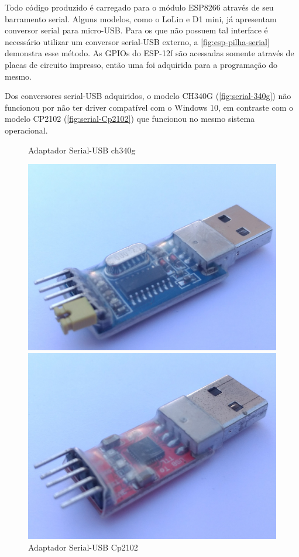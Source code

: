 Todo código produzido é carregado para o módulo ESP8266 através de seu
barramento serial. Alguns modelos, como o LoLin e D1 mini, já apresentam
conversor serial para micro-USB. Para os que não possuem tal interface é
necessário utilizar um conversor serial-USB externo, a
\autoref{fig:esp-pilha-serial} demonstra esse método. As GPIOs do ESP-12f são
acessadas somente através de placas de circuito impresso, então uma foi
adquirida para a programação do mesmo.

Dos conversores serial-USB adquiridos, o modelo CH340G
(\autoref{fig:serial-340g}) não funcionou por não ter driver compatível com o
Windows 10, em contraste com o modelo CP2102 (\autoref{fig:serial-Cp2102}) que
funcionou no mesmo sistema operacional.


\begin{figure}[htb]
	\centering
	\begin{minipage}{0.49\textwidth}
		\centering
		\caption{Adaptador Serial-USB ch340g \label{fig:serial-340g}}
		\includegraphics[width=1\textwidth]{041-esp8266/img/serial-ch340g.jpg}
	\end{minipage}
	\hfill
	\begin{minipage}{0.49\textwidth}
		\centering
		\caption{Adaptador Serial-USB Cp2102 \label{fig:serial-Cp2102}}
		\includegraphics[width=1\textwidth]{041-esp8266/img/serial-Cp2102.jpg}

\end{minipage}
\end{figure}

